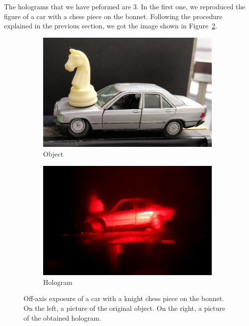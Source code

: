 \documentclass[11pt,a4paper]{article}
\begin{document}
The holograms that we have peformed are 3. In the first one, we reproduced the figure of a car with a chess piece on the bonnet. Following the procedure explained in the previous section, we got the image shown in Figure~\ref{fig:off_axis_hologram1}.
\begin{figure}[ht]
\centering
\begin{subfigure}[b]{0.45\textwidth}
\includegraphics[width=\textwidth]{car_knight}
\caption{Object}
\label{fig:car_knight1}
\end{subfigure}
\begin{subfigure}[b]{0.45\textwidth}
\includegraphics[width=\textwidth]{Off-axis_hologram}
\caption{Hologram}
\label{fig:off_axis_hologram1}
\end{subfigure}
\caption{Off-axis exposure of a car with a knight chess piece on the bonnet. On the left, a picture of the original object. On the right, a picture of the obtained hologram.}
\label{fig:off-axis_exposure}
\end{figure}
\end{document}
